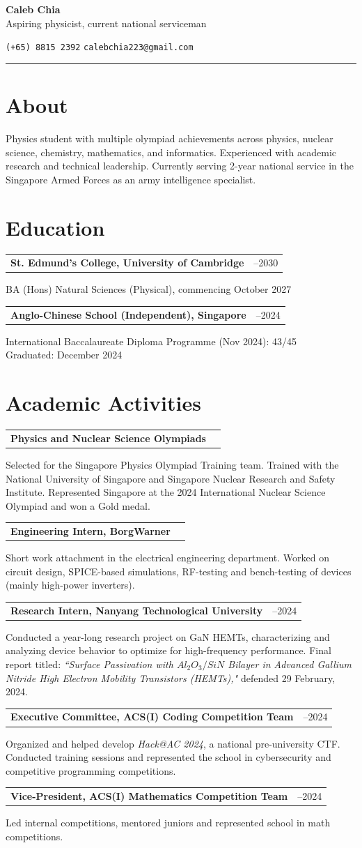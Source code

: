 \documentclass[11pt,a4paper]{article}
\makeatletter
\newcommand{\indentedsection}[2]{
  \section*{#1}
  \vspace{-4pt}
  \hspace{1.5em}
  \begin{minipage}{\dimexpr\textwidth-1.5em}
    #2
  \end{minipage}
}
\newcommand{\entry}[3]{
  \begin{minipage}{\textwidth}
    \noindent
    \begin{tabularx}{\textwidth}{@{}>{\bfseries}X@{\hspace{5em}}>{\raggedleft\arraybackslash}p{3cm}@{}}
      #1 & #2 \\
    \end{tabularx}
    \par\vspace{0.1em} %
    \begin{minipage}[t]{\dimexpr\textwidth - 9em\relax}
      \setlength{\parskip}{0.4em} %
      #3
    \end{minipage}
    \vspace{10pt}
  \end{minipage}
  
}
\makeatother
\begin{document}
\begin{center}
  \textbf{\Large Caleb Chia} \\
  \vspace{3pt}
  Aspiring physicist, current national serviceman \\
  \vspace{4pt}
\end{center}
\begin{flushright}
  \texttt{(+65) 8815 2392} \hfill \texttt{calebchia223@gmail.com}\\
\end{flushright}

\noindent\rule[10pt]{\linewidth}{0.4pt}
\vspace{-22pt}


\indentedsection{About}{
  Physics student with multiple olympiad achievements across physics, nuclear science, chemistry, mathematics, and informatics. Experienced with academic research and technical leadership. Currently serving 2-year national service in the Singapore Armed Forces as an army intelligence specialist. 
}

\indentedsection{Education}{
  \entry{St. Edmund's College, University of Cambridge}{2027--2030}
  {BA (Hons) Natural Sciences (Physical), commencing October 2027} 
  \entry{Anglo-Chinese School (Independent), Singapore}{2019--2024}
  {International Baccalaureate Diploma Programme (Nov 2024): 43/45\\
  Graduated: December 2024} 
}


\indentedsection{Academic Activities}{

  \entry{Physics and Nuclear Science Olympiads}{2024}
  {Selected for the Singapore Physics Olympiad Training team. Trained with the National University of Singapore and Singapore Nuclear Research and Safety Institute. Represented Singapore at the 2024 International Nuclear Science Olympiad and won a Gold medal.} 
  
  \entry{Engineering Intern, BorgWarner}{2024}
  {Short work attachment in the electrical engineering department. Worked on circuit design, SPICE-based simulations, RF-testing and bench-testing of devices (mainly high-power inverters).} 

  \entry{Research Intern, Nanyang Technological University}{2023--2024}
  {Conducted a year-long research project on GaN HEMTs, characterizing and analyzing device behavior to optimize for high-frequency performance. Final report titled: 
  \textit{``Surface Passivation with \(Al_2 O_3/SiN \) Bilayer in Advanced Gallium Nitride High Electron Mobility Transistors (HEMTs),"} defended 29 February, 2024.} 

  \entry{Executive Committee, ACS(I) Coding Competition Team}{2023--2024}
  {Organized and helped develop \textit{Hack@AC 2024}, a national pre-university CTF. Conducted training sessions and represented the school in cybersecurity and competitive programming competitions.} 

  \entry{Vice-President, ACS(I) Mathematics Competition Team}{2022--2024}
  {Led internal competitions, mentored juniors and represented school in math competitions. } 

}
\end{document}
